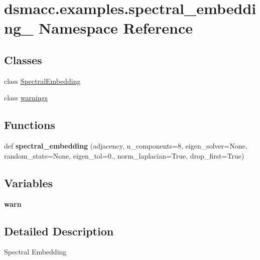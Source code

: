 \hypertarget{namespacedsmacc_1_1examples_1_1spectral__embedding__}{}\section{dsmacc.\+examples.\+spectral\+\_\+embedding\+\_\+ Namespace Reference}
\label{namespacedsmacc_1_1examples_1_1spectral__embedding__}
\subsection*{Classes}
\begin{DoxyCompactItemize}
\item 
class \mbox{\hyperlink{classdsmacc_1_1examples_1_1spectral__embedding___1_1SpectralEmbedding}{Spectral\+Embedding}}
\item 
class \mbox{\hyperlink{classdsmacc_1_1examples_1_1spectral__embedding___1_1warnings}{warnings}}
\end{DoxyCompactItemize}
\subsection*{Functions}
\begin{DoxyCompactItemize}
\item 
\mbox{\label{namespacedsmacc_1_1examples_1_1spectral__embedding___a148e35cf0b26ac1e35fdc853dbf522ed}} 
def {\bfseries spectral\+\_\+embedding} (adjacency, n\+\_\+components=8, eigen\+\_\+solver=None, random\+\_\+state=None, eigen\+\_\+tol=0., norm\+\_\+laplacian=True, drop\+\_\+first=True)
\end{DoxyCompactItemize}
\subsection*{Variables}
\begin{DoxyCompactItemize}
\item 
\mbox{\label{namespacedsmacc_1_1examples_1_1spectral__embedding___a8607649f885d2fc5960894043097b4e0}} 
{\bfseries warn}
\end{DoxyCompactItemize}


\subsection{Detailed Description}
\begin{DoxyVerb}Spectral Embedding\end{DoxyVerb}
 